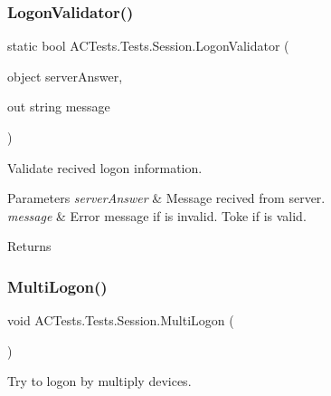 \subsubsection{\texorpdfstring{Logon\+Validator()}{LogonValidator()}}
{\footnotesize\ttfamily static bool A\+C\+Tests.\+Tests.\+Session.\+Logon\+Validator (\begin{DoxyParamCaption}\item[{object}]{server\+Answer,  }\item[{out string}]{message }\end{DoxyParamCaption})\hspace{0.3cm}{\ttfamily [static]}}



Validate recived logon information. 


\begin{DoxyParams}{Parameters}
{\em server\+Answer} & Message recived from server.\\
\hline
{\em message} & Error message if is invalid. Toke if is valid.\\
\hline
\end{DoxyParams}
\begin{DoxyReturn}{Returns}

\end{DoxyReturn}
\mbox{\label{class_a_c_tests_1_1_tests_1_1_session_a5a734ff8b5aa87833325f944d7efa379}} 
\subsubsection{\texorpdfstring{Multi\+Logon()}{MultiLogon()}}
{\footnotesize\ttfamily void A\+C\+Tests.\+Tests.\+Session.\+Multi\+Logon (\begin{DoxyParamCaption}{ }\end{DoxyParamCaption})}



Try to logon by multiply devices. 

\mbox{\label{class_a_c_tests_1_1_tests_1_1_session_a973fe8f58c877ca9f382869fec5c9d6d}} 
